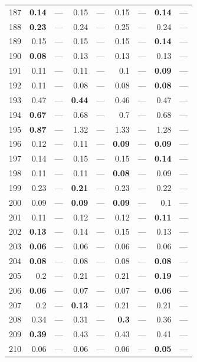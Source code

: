 \begin{longtable}{lr@{\hskip 4pt}l@{\hskip 12pt}r@{\hskip 4pt}l@{\hskip 12pt}r@{\hskip 4pt}l@{\hskip 12pt}r@{\hskip 4pt}l@{\hskip 12pt}}
187 & \textbf{0.14} & --- & 0.15 & --- & 0.15 & --- & \textbf{0.14} & --- \\
188 & \textbf{0.23} & --- & 0.24 & --- & 0.25 & --- & 0.24 & --- \\
189 & 0.15 & --- & 0.15 & --- & 0.15 & --- & \textbf{0.14} & --- \\
190 & \textbf{0.08} & --- & 0.13 & --- & 0.13 & --- & 0.13 & --- \\
191 & 0.11 & --- & 0.11 & --- & 0.1 & --- & \textbf{0.09} & --- \\
192 & 0.11 & --- & 0.08 & --- & 0.08 & --- & \textbf{0.08} & --- \\
193 & 0.47 & --- & \textbf{0.44} & --- & 0.46 & --- & 0.47 & --- \\
194 & \textbf{0.67} & --- & 0.68 & --- & 0.7 & --- & 0.68 & --- \\
195 & \textbf{0.87} & --- & 1.32 & --- & 1.33 & --- & 1.28 & --- \\
196 & 0.12 & --- & 0.11 & --- & \textbf{0.09} & --- & \textbf{0.09} & --- \\
197 & 0.14 & --- & 0.15 & --- & 0.15 & --- & \textbf{0.14} & --- \\
198 & 0.11 & --- & 0.11 & --- & \textbf{0.08} & --- & 0.09 & --- \\
199 & 0.23 & --- & \textbf{0.21} & --- & 0.23 & --- & 0.22 & --- \\
200 & 0.09 & --- & \textbf{0.09} & --- & \textbf{0.09} & --- & 0.1 & --- \\
201 & 0.11 & --- & 0.12 & --- & 0.12 & --- & \textbf{0.11} & --- \\
202 & \textbf{0.13} & --- & 0.14 & --- & 0.15 & --- & 0.13 & --- \\
203 & \textbf{0.06} & --- & 0.06 & --- & 0.06 & --- & 0.06 & --- \\
204 & \textbf{0.08} & --- & 0.08 & --- & 0.08 & --- & \textbf{0.08} & --- \\
205 & 0.2 & --- & 0.21 & --- & 0.21 & --- & \textbf{0.19} & --- \\
206 & \textbf{0.06} & --- & 0.07 & --- & 0.07 & --- & \textbf{0.06} & --- \\
207 & 0.2 & --- & \textbf{0.13} & --- & 0.21 & --- & 0.21 & --- \\
208 & 0.34 & --- & 0.31 & --- & \textbf{0.3} & --- & 0.36 & --- \\
209 & \textbf{0.39} & --- & 0.43 & --- & 0.43 & --- & 0.41 & --- \\
210 & 0.06 & --- & 0.06 & --- & 0.06 & --- & \textbf{0.05} & --- \\

\end{longtable}

